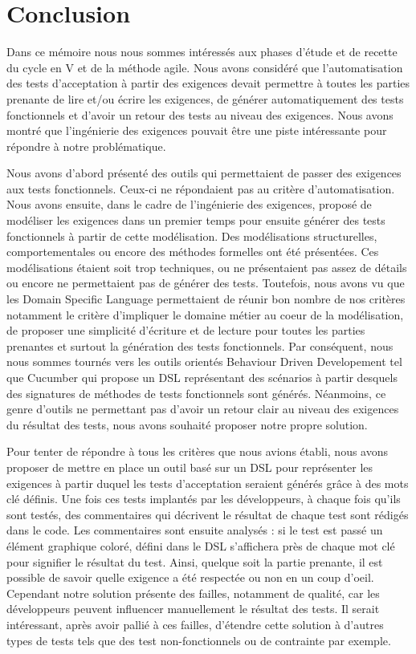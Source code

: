 \chapter*{Conclusion}
\label{chap:conclusion}



Dans ce mémoire nous nous sommes intéressés aux phases d'étude et de recette du cycle en V et de la méthode agile. Nous avons considéré que l'automatisation des tests d'acceptation à partir des exigences devait permettre à toutes les parties prenante de lire et/ou écrire les exigences, de générer automatiquement des tests fonctionnels et d'avoir un retour des tests au niveau des exigences. Nous avons montré que l'ingénierie des exigences pouvait être une piste intéressante pour répondre à notre problématique.

Nous avons d'abord présenté des outils qui permettaient de passer des exigences aux tests fonctionnels. Ceux-ci ne répondaient pas au critère d'automatisation. Nous avons ensuite, dans le cadre de l'ingénierie des exigences, proposé de modéliser les exigences dans un premier temps pour ensuite générer des tests fonctionnels à partir de cette modélisation. Des modélisations structurelles, comportementales ou encore des méthodes formelles ont été présentées. Ces modélisations étaient soit trop techniques, ou ne présentaient pas assez de détails ou encore ne permettaient pas de générer des tests. Toutefois, nous avons vu que les Domain Specific Language permettaient de réunir bon nombre de nos critères notamment le critère d'impliquer le domaine métier au coeur de la modélisation, de proposer une simplicité d'écriture et de lecture pour toutes les parties prenantes et surtout la génération des tests fonctionnels. Par conséquent, nous nous sommes tournés vers les outils orientés Behaviour Driven Developement tel que Cucumber qui propose un DSL représentant des scénarios à partir desquels des signatures de méthodes de tests fonctionnels sont générés. Néanmoins, ce genre d'outils ne permettant pas d'avoir un retour clair au niveau des exigences du résultat des tests, nous avons souhaité proposer notre propre solution.

Pour tenter de répondre à tous les critères que nous avions établi, nous avons proposer de mettre en place un outil basé sur un DSL pour représenter les exigences à partir duquel les tests d'acceptation seraient générés grâce à des mots clé définis. Une fois ces tests implantés par les développeurs, à chaque fois qu'ils sont testés, des commentaires qui décrivent le résultat de chaque test sont rédigés dans le code. Les commentaires sont ensuite analysés : si le test est passé un élément graphique coloré, défini dans le DSL s'affichera près de chaque mot clé pour signifier le résultat du test. Ainsi, quelque soit la partie prenante, il est possible de savoir quelle exigence a été respectée ou non en un coup d'oeil.
Cependant notre solution présente des failles, notamment de qualité, car les développeurs peuvent influencer manuellement le résultat des tests. 
Il serait intéressant, après avoir pallié à ces failles, d'étendre cette solution à d'autres types de tests tels que des test non-fonctionnels ou de contrainte par exemple.